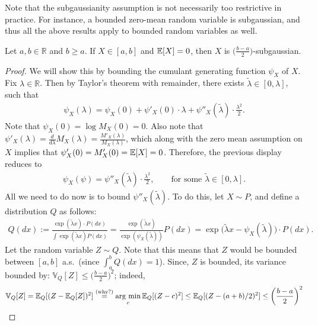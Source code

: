 \documentclass[twoside]{article}
\newcommand{\RR}{\mathbb{R}}
\begin{document}
    Note that the subgaussianity assumption is not necessarily too restrictive in practice. For instance, a bounded zero-mean random variable is subgaussian, and thus all the above results apply to bounded random variables as well.
    \begin{lemma}[Hoeffding's]
      Let $a, b \in \RR$ and $b \geq a$. If $X \in [a, b]$ and $\mathbb{E}[X] = 0$, then $X$ is $\big( \frac{b-a}{2} \big)$-subgaussian.
    \end{lemma}
    \begin{proof}
      We will show this by bounding the cumulant generating function $\psi_X$ of $X$. Fix $\lambda \in \RR$. Then by Taylor's theorem with remainder, there exists $\tilde \lambda \in [0, \lambda]$, such that
      \begin{align*}
        \psi_X(\lambda) = \psi_X(0) + \psi'_X(0) \cdot \lambda + \psi''_X(\tilde \lambda) \cdot \frac{\lambda^2}{2}.
      \end{align*}
      Note that $\psi_X(0) = \log M_X(0) = 0$. Also note that $\psi'_X(\lambda) = \frac{d}{d \lambda} M_X(\lambda) = \frac{M'_X(\lambda)}{M_X(\lambda)}$, which along with the zero mean assumption on $X$ implies that $\psi'_X(0) = M'_X(0) = \mathbb{E}[X] = 0$. Therefore, the previous display reduces to
      \begin{align}
        \psi_X(\psi) = \psi''_X(\tilde \lambda) \cdot \frac{\lambda^2}{2}, \qquad \text{for some } \tilde \lambda \in [0, \lambda]. \label{eq: cgf_taylor_remainder}
      \end{align}
      All we need to do now is to bound $\psi''_X(\tilde \lambda)$. To do this, let $X \sim P$, and define a distribution $Q$ as follows:
      \begin{align*}
        Q(dx) := \frac{\exp (\tilde \lambda x) \cdot P(dx)}{\int \exp (\tilde \lambda x) P(dx)} = \frac{\exp (\tilde \lambda x)}{\exp (\psi_X(\tilde \lambda))} P(dx) = \exp \big( \tilde \lambda x - \psi_X(\tilde \lambda) \big) \cdot P(dx).
      \end{align*}
      Let the random variable $Z \sim Q$. Note that this means that $Z$ would be bounded between $[a, b]$ a.s.\ (since $\int_a^b Q(dx) = 1$). Since, $Z$ is bounded, its variance bounded by: $\mathbb{V}_Q[Z] \leq \big(\frac{b-a}{2}\big)^2$; indeed,
      \begin{align*}
        \mathbb{V}_Q[Z] = \mathbb{E}_Q[(Z - \mathbb{E}_Q[Z])^2] \stackrel{\text{(why?)}}{=} \operatorname*{arg\ min}_{c} \mathbb{E}_Q[(Z - c)^2] \leq \mathbb{E}_Q[(Z - (a+b)/2)^2] \leq \bigg(\frac{b-a}{2}\bigg)^2
      \end{align*}

\end{proof}
\end{document}
